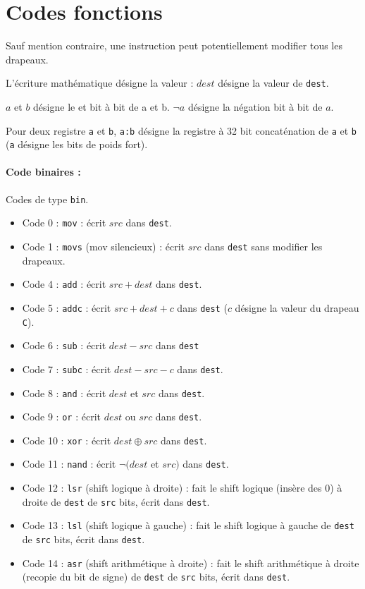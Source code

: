 \documentclass[12pt]{article}
\begin{document}
\section{Codes fonctions}

Sauf mention contraire, une instruction peut potentiellement modifier tous les
drapeaux.

L'écriture mathématique désigne la valeur : $dest$ désigne la valeur de \verb!dest!.

$a$ et $b$ désigne le \og et \fg{} bit à bit de a et b. $\neg a$ désigne la
négation bit à bit de $a$.

Pour deux registre \verb!a! et \verb!b!, \verb!a:b! désigne la registre à 32 bit
concaténation de \verb!a! et \verb!b! (\verb!a! désigne les bits de poids fort).


\paragraph{Code binaires :} Codes de type \verb!bin!.
\begin{itemize}
\item Code 0 : \verb!mov! : écrit $src$ dans \verb!dest!.
\item Code 1 : \verb!movs! (mov silencieux) : écrit $src$ dans \verb!dest!
  sans modifier les drapeaux.
\item Code 4 : \verb!add! : écrit $src + dest$ dans \verb!dest!.
\item Code 5 : \verb!addc! : écrit $src + dest + c$ dans \verb!dest! ($c$
  désigne la valeur du drapeau \verb!C!).
\item Code 6 : \verb!sub! : écrit $dest - src$ dans \verb!dest!
\item Code 7 : \verb!subc! : écrit $dest - src -c $ dans \verb!dest!.
\item Code 8 : \verb!and! : écrit $dest$ et $src$ dans \verb!dest!.
\item Code 9 : \verb!or! : écrit $dest$ ou $src$ dans \verb!dest!.
\item Code 10 : \verb!xor! : écrit $dest \oplus src$ dans \verb!dest!.
\item Code 11 : \verb!nand! : écrit $\neg(dest$ et $src)$ dans \verb!dest!.
\item Code 12 : \verb!lsr! (shift logique à droite) : fait le shift logique
  (insère des 0) à droite de \verb!dest! de \verb!src! bits, écrit dans \verb!dest!.
\item Code 13 : \verb!lsl! (shift logique à gauche) : fait le shift logique à
  gauche de \verb!dest! de \verb!src! bits, écrit dans \verb!dest!.
\item Code 14 : \verb!asr! (shift arithmétique à droite) : fait le shift arithmétique à
  droite (recopie du bit de signe) de \verb!dest! de \verb!src! bits, écrit dans \verb!dest!.
\end{itemize}
\end{document}
